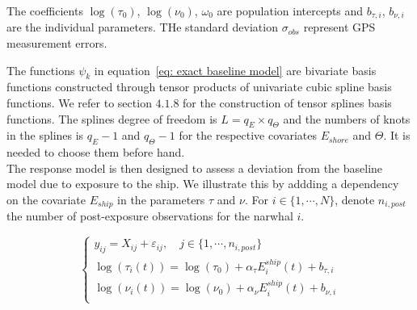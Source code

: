 \documentclass[11pt]{article}
\newcommand {\1}{\mathbb{1}}
\theoremstyle{definition}
\theoremstyle{remark}
\theoremstyle{remark}
\begin{document}
The coefficients $\log(\tau_{0})$, $\log(\nu_{0})$, $\omega_{0}$ are population intercepts and $b_{\tau,i}$, $b_{\nu,i}$
are the individual parameters. THe standard deviation $\sigma_{obs}$ represent GPS measurement errors.

The functions $\psi_k$ in equation~\eqref{eq: exact baseline model} are bivariate basis functions constructed through tensor products of univariate cubic spline basis functions. We refer to \cite{wood_generalized_2017} section $4.
1.8$ for the construction of tensor splines basis functions. The splines degree of freedom is $L=q_E \times q_{\Theta}$ and the numbers of knots in the splines is $q_E-1$ and $q_{\Theta}-1$ for the respective covariates $E_{shore}$ and $\Theta$. It is needed to choose them before hand.\\

The response model is then designed to assess a deviation from the baseline model due to exposure to the ship. We illustrate this by addding a dependency on the covariate $E_{ship}$ in the parameters $\tau$ and $\nu$. 
For $i \in \{1, \cdots, N\}$, denote $n_{i,post}$ the number of post-exposure observations for the narwhal $i$.

\begin{equation}   \left\{
	\begin{array}{l}
		y_{ij}=X_{ij}+\varepsilon_{ij}, \quad j \in \{1,\cdots,n_{i,post}\} \\
		\log(\tau_{i}(t))=\log(\tau_{0})+\alpha_{\tau} E^{ship}_i(t)+b_{\tau,i} \\
		\log(\nu_{i}(t))=\log(\nu_{0}) +  \alpha_{\nu} E^{ship}_i(t) +b_{\nu,i}  \\
	\end{array}
	\right.
	\label{eq: exact response model}
\end{equation}
\end{document}
